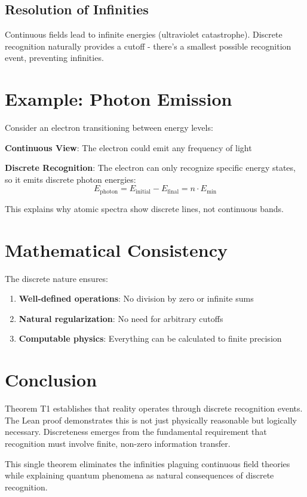 \documentclass[11pt]{article}
\theoremstyle{definition}
\begin{document}
\subsection{Resolution of Infinities}
Continuous fields lead to infinite energies (ultraviolet catastrophe). Discrete recognition naturally provides a cutoff - there's a smallest possible recognition event, preventing infinities.

\section{Example: Photon Emission}

Consider an electron transitioning between energy levels:

\textbf{Continuous View}: The electron could emit any frequency of light

\textbf{Discrete Recognition}: The electron can only recognize specific energy states, so it emits discrete photon energies:
$$E_{\text{photon}} = E_{\text{initial}} - E_{\text{final}} = n \cdot E_{\text{min}}$$

This explains why atomic spectra show discrete lines, not continuous bands.

\section{Mathematical Consistency}

The discrete nature ensures:
\begin{enumerate}
    \item \textbf{Well-defined operations}: No division by zero or infinite sums
    \item \textbf{Natural regularization}: No need for arbitrary cutoffs
    \item \textbf{Computable physics}: Everything can be calculated to finite precision
\end{enumerate}

\section{Conclusion}

Theorem T1 establishes that reality operates through discrete recognition events. The Lean proof demonstrates this is not just physically reasonable but logically necessary. Discreteness emerges from the fundamental requirement that recognition must involve finite, non-zero information transfer.

This single theorem eliminates the infinities plaguing continuous field theories while explaining quantum phenomena as natural consequences of discrete recognition.
\end{document}

